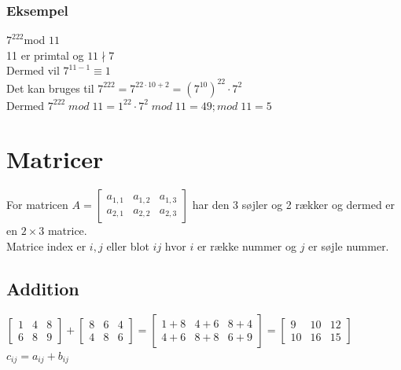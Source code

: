 \documentclass[12pt, a4paper]{article}
\begin{document}
				\subsubsection{Eksempel}
				$7^{222}$mod $11$\\
				11 er primtal og $11\nmid 7$\\
				Dermed vil $7^{11-1}\equiv 1$\\
				Det kan bruges til $7^{222}=7^{22\cdot 10+2}=(7^10)^{22}\cdot 7^2$\\
				Dermed $7^{222}\;mod\;11=1^22\cdot 7^2\;mod\;11=49;mod\;11=5$
	\section{Matricer}
		For matricen $A=\begin{bmatrix}a_{1,1}& a_{1,2}& a_{1,3}\\ a_{2,1}& a_{2,2}& a_{2,3}\end{bmatrix}$ har den 3 søjler og 2 rækker og dermed er en $2\times 3$ matrice.\\
		Matrice index er $i,j$ eller blot $ij$ hvor $i$ er række nummer og $j$ er søjle nummer.
		\subsection{Addition}
			$\begin{bmatrix} 1& 4& 8\\ 6& 8& 9\end{bmatrix}+\begin{bmatrix} 8& 6& 4\\ 4& 8& 6\end{bmatrix}=\begin{bmatrix}1+8& 4+6& 8+4\\4+6& 8+8& 6+9\end{bmatrix}=\begin{bmatrix}9& 10& 12\\10& 16& 15\end{bmatrix}$\\
			$c_{ij}=a_{ij}+b_{ij}$
\end{document}
